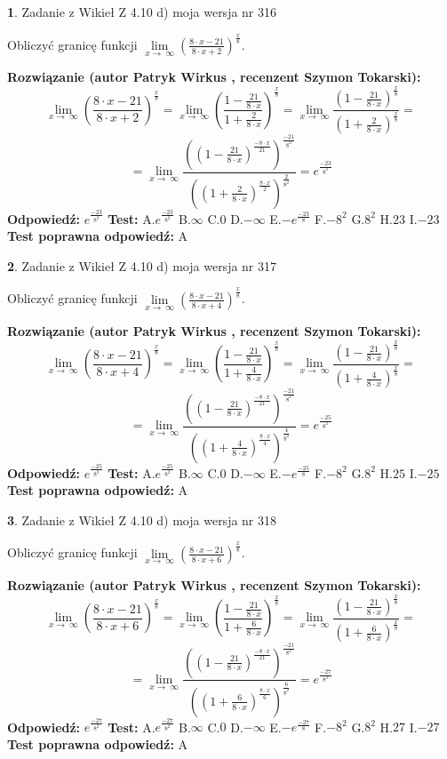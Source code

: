 \documentclass[12pt, a4paper]{article}
\theoremstyle{definition} %
\newtheorem{zad}{}
\newcommand{\zadStart}[1]{\begin{zad}#1\newline}
\newcommand{\zadStop}{\end{zad}}
\newcommand{\rozwStart}[2]{\noindent \textbf{Rozwiązanie (autor #1 , recenzent #2): }\newline}
\newcommand{\rozwStop}{\newline}
\newcommand{\odpStart}{\noindent \textbf{Odpowiedź:}\newline}
\newcommand{\odpStop}{\newline}
\newcommand{\testStart}{\noindent \textbf{Test:}\newline}
\newcommand{\testStop}{\newline}
\newcommand{\kluczStart}{\noindent \textbf{Test poprawna odpowiedź:}\newline}
\newcommand{\kluczStop}{\newline}
\begin{document}
\zadStart{Zadanie z Wikieł Z 4.10 d) moja wersja nr 316}


Obliczyć granicę funkcji  $\lim\limits_{x\to\ \infty}(\frac{8\cdot x-21}{8\cdot x+2})^{\frac{x}{8}}$.
\zadStop
\rozwStart{Patryk Wirkus}{Szymon Tokarski}
$$\lim\limits_{x\to\ \infty}(\frac{8\cdot x-21}{8\cdot x+2})^{\frac{x}{8}} = \lim\limits_{x\to\ \infty}(\frac{1-\frac{21}{8\cdot x}}{1+\frac{2}{8\cdot x}})^{\frac{x}{8}}=\lim\limits_{x\to\ \infty}\frac{(1-\frac{21}{8\cdot x})^{\frac{x}{8}}}{(1+\frac{2}{8\cdot x})^{\frac{x}{8}}}=$$
$$=\lim\limits_{x\to\ \infty}\frac{((1-\frac{21}{8\cdot x})^{\frac{-8\cdot x}{21}})^{\frac{-21}{8^{2}}}}{((1+\frac{2}{8\cdot x})^{\frac{8\cdot x}{2}})^{\frac{2}{8^{2}}}}=e^{\frac{-23}{8^{2}}}$$
\rozwStop
\odpStart
$e^{\frac{-23}{8^{2}}}$
\odpStop
\testStart
A.$e^{\frac{-23}{8^{2}}}$ B.$\infty$ C.$0$ D.$-\infty$ E.$-e^{\frac{-23}{8}}$
F.$-8^{2}$ G.$8^{2}$
H.$23$
I.$-23$
\testStop
\kluczStart
A
\kluczStop



\zadStart{Zadanie z Wikieł Z 4.10 d) moja wersja nr 317}


Obliczyć granicę funkcji  $\lim\limits_{x\to\ \infty}(\frac{8\cdot x-21}{8\cdot x+4})^{\frac{x}{8}}$.
\zadStop
\rozwStart{Patryk Wirkus}{Szymon Tokarski}
$$\lim\limits_{x\to\ \infty}(\frac{8\cdot x-21}{8\cdot x+4})^{\frac{x}{8}} = \lim\limits_{x\to\ \infty}(\frac{1-\frac{21}{8\cdot x}}{1+\frac{4}{8\cdot x}})^{\frac{x}{8}}=\lim\limits_{x\to\ \infty}\frac{(1-\frac{21}{8\cdot x})^{\frac{x}{8}}}{(1+\frac{4}{8\cdot x})^{\frac{x}{8}}}=$$
$$=\lim\limits_{x\to\ \infty}\frac{((1-\frac{21}{8\cdot x})^{\frac{-8\cdot x}{21}})^{\frac{-21}{8^{2}}}}{((1+\frac{4}{8\cdot x})^{\frac{8\cdot x}{4}})^{\frac{4}{8^{2}}}}=e^{\frac{-25}{8^{2}}}$$
\rozwStop
\odpStart
$e^{\frac{-25}{8^{2}}}$
\odpStop
\testStart
A.$e^{\frac{-25}{8^{2}}}$ B.$\infty$ C.$0$ D.$-\infty$ E.$-e^{\frac{-25}{8}}$
F.$-8^{2}$ G.$8^{2}$
H.$25$
I.$-25$
\testStop
\kluczStart
A
\kluczStop



\zadStart{Zadanie z Wikieł Z 4.10 d) moja wersja nr 318}


Obliczyć granicę funkcji  $\lim\limits_{x\to\ \infty}(\frac{8\cdot x-21}{8\cdot x+6})^{\frac{x}{8}}$.
\zadStop
\rozwStart{Patryk Wirkus}{Szymon Tokarski}
$$\lim\limits_{x\to\ \infty}(\frac{8\cdot x-21}{8\cdot x+6})^{\frac{x}{8}} = \lim\limits_{x\to\ \infty}(\frac{1-\frac{21}{8\cdot x}}{1+\frac{6}{8\cdot x}})^{\frac{x}{8}}=\lim\limits_{x\to\ \infty}\frac{(1-\frac{21}{8\cdot x})^{\frac{x}{8}}}{(1+\frac{6}{8\cdot x})^{\frac{x}{8}}}=$$
$$=\lim\limits_{x\to\ \infty}\frac{((1-\frac{21}{8\cdot x})^{\frac{-8\cdot x}{21}})^{\frac{-21}{8^{2}}}}{((1+\frac{6}{8\cdot x})^{\frac{8\cdot x}{6}})^{\frac{6}{8^{2}}}}=e^{\frac{-27}{8^{2}}}$$
\rozwStop
\odpStart
$e^{\frac{-27}{8^{2}}}$
\odpStop
\testStart
A.$e^{\frac{-27}{8^{2}}}$ B.$\infty$ C.$0$ D.$-\infty$ E.$-e^{\frac{-27}{8}}$
F.$-8^{2}$ G.$8^{2}$
H.$27$
I.$-27$
\testStop
\kluczStart
A
\kluczStop
\end{document}
